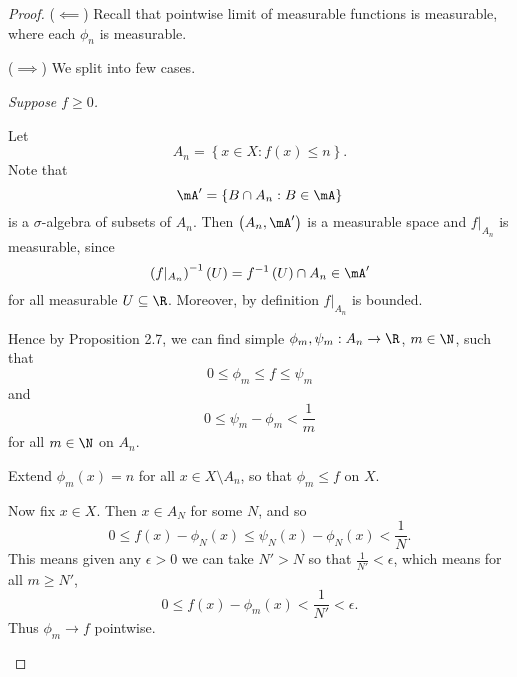 \documentclass[pmath451]{subfiles}
\begin{document}
    \begin{proof}
        ($\impliedby$) Recall that pointwise limit of measurable functions is measurable, where each $\phi_n$ is measurable.

        ($\implies$) We split into few cases.

        \begin{case}
            \textit{Suppose $f\geq 0$.}

            Let
            \begin{equation*}
                A_n = \left\lbrace x\in X: f\left( x \right)\leq n \right\rbrace.
            \end{equation*}
            Note that
            \begin{equation*}
                \mA' = \left\lbrace B\cap A_n: B\in\mA \right\rbrace
            \end{equation*}
            is a $\sigma$-algebra of subsets of $A_n$. Then $\left( A_n,\mA' \right)$ is a measurable space and $f|_{A_n}$ is measurable, since
            \begin{equation*}
                \left( f|_{A_n} \right)^{-1}\left( U \right) = f^{-1}\left( U \right)\cap A_n\in\mA'
            \end{equation*}
            for all measurable $U\subseteq\R$. Moreover, by definition $f|_{A_n}$ is bounded.

            Hence by Proposition 2.7, we can find simple $\phi_m,\psi_m:A_n\to\R$, $m\in\N$, such that
            \begin{equation*}
                0\leq\phi_m\leq f\leq\psi_m
            \end{equation*}
            and
            \begin{equation*}
                0\leq\psi_m-\phi_m<\frac{1}{m}
            \end{equation*}
            for all $m\in\N$ on $A_n$.

            Extend $\phi_m\left( x \right) = n$ for all $x\in X\setminus A_n$, so that $\phi_m\leq f$ on $X$. 

            Now fix $x\in X$. Then $x\in A_N$ for some $N$, and so
            \begin{equation*}
                0 \leq f\left( x \right)-\phi_N\left( x \right)\leq\psi_N\left( x \right)-\phi_N\left( x \right)<\frac{1}{N}.
            \end{equation*}
            This means given any $\epsilon>0$ we can take $N'>N$ so that $\frac{1}{N'} < \epsilon$, which means for all $m\geq N'$,
            \begin{equation*}
                0 \leq f\left( x \right) - \phi_m\left( x \right) < \frac{1}{N'} < \epsilon.
            \end{equation*}
            Thus $\phi_m\to f$ pointwise.
        \end{case}


\end{proof}
\end{document}
